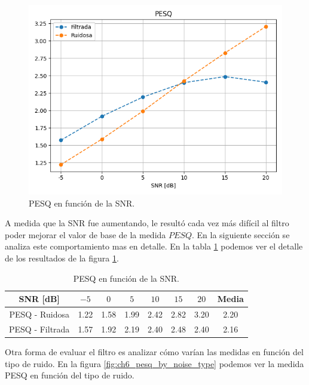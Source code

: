 \begin{figure}
	\centering
	\centerline{\includegraphics[scale=0.75]{images/ch6/pesq_by_snr.png}}
	\caption{PESQ en función de la SNR.}
	\label{fig:ch6_pesq_by_snr}
\end{figure}

A medida que la SNR fue aumentando, le resultó cada vez más difícil al filtro poder mejorar el valor de base de la medida $PESQ$. En la siguiente sección se analiza este comportamiento mas en detalle. En la tabla \ref{table:pesq_by_snr} podemos ver el detalle de los resultados de la figura \ref{fig:ch6_pesq_by_snr}.

\begin{table}
	\centering
	\begin{tabular}{ |c|c|c|c|c|c|c|c| } 
		\hline
		SNR [dB] & $-5$ & $0$ & $5$ & $10$ & $15$ & $20$ & Media \\ 
		\hline
		PESQ - Ruidosa & 1.22 & 1.58 & 1.99 & 2.42 & 2.82 & 3.20 & 2.20 \\
		PESQ - Filtrada & 1.57 & 1.92 & 2.19 & 2.40 & 2.48 & 2.40 & 2.16 \\
		\hline
	\end{tabular}
	\caption{PESQ en función de la SNR.}
	\label{table:pesq_by_snr}
\end{table}

Otra forma de evaluar el filtro es analizar cómo varían las medidas en función del tipo de ruido. En la figura \ref{fig:ch6_pesq_by_noise_type} podemos ver la medida PESQ en función del tipo de ruido.

